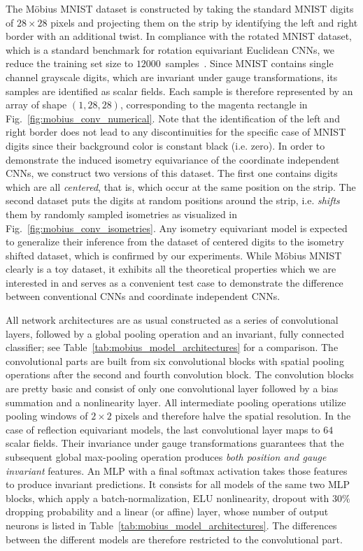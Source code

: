 The M\"obius MNIST dataset is constructed by taking the standard MNIST digits of $28\times28$ pixels and projecting them on the strip by identifying the left and right border with an additional twist.
In compliance with the rotated MNIST dataset, which is a standard benchmark for rotation equivariant Euclidean CNNs, we reduce the training set size to $12000$~samples~\cite{Weiler2018SFCNN,Weiler2019_E2CNN}.
Since MNIST contains single channel grayscale digits, which are invariant under gauge transformations, its samples are identified as scalar fields.
Each sample is therefore represented by an array of shape $(1,28,28)$, corresponding to the magenta rectangle in Fig.~\ref{fig:mobius_conv_numerical}.
Note that the identification of the left and right border does not lead to any discontinuities for the specific case of MNIST digits since their background color is constant black (i.e. zero).
In order to demonstrate the induced isometry equivariance of the coordinate independent CNNs, we construct two versions of this dataset.
The first one contains digits which are all \emph{centered}, that is, which occur at the same position on the strip.
The second dataset puts the digits at random positions around the strip, i.e. \emph{shifts} them by randomly sampled isometries as visualized in Fig.~\ref{fig:mobius_conv_isometries}.
Any isometry equivariant model is expected to generalize their inference from the dataset of centered digits to the isometry shifted dataset, which is confirmed by our experiments.
While M\"obius MNIST clearly is a toy dataset, it exhibits all the theoretical properties which we are interested in and serves as a convenient test case to demonstrate the difference between conventional CNNs and coordinate independent CNNs.

All network architectures are as usual constructed as a series of convolutional layers, followed by a global pooling operation and an invariant, fully connected classifier; see Table~\ref{tab:mobius_model_architectures} for a comparison.
The convolutional parts are built from six convolutional blocks with spatial pooling operations after the second and fourth convolution block.
The convolution blocks are pretty basic and consist of only one convolutional layer followed by a bias summation and a nonlinearity layer.
All intermediate pooling operations utilize pooling windows of $2\times2$ pixels and therefore halve the spatial resolution.
In the case of reflection equivariant models, the last convolutional layer maps to $64$ scalar fields.
Their invariance under gauge transformations guarantees that the subsequent global max-pooling operation produces \emph{both position and gauge invariant} features.
An MLP with a final softmax activation takes those features to produce invariant predictions.
It consists for all models of the same two MLP blocks, which apply a batch-normalization, ELU nonlinearity, dropout with $30\%$ dropping probability and a linear (or affine) layer, whose number of output neurons is listed in Table~\ref{tab:mobius_model_architectures}.
The differences between the different models are therefore restricted to the convolutional part.

